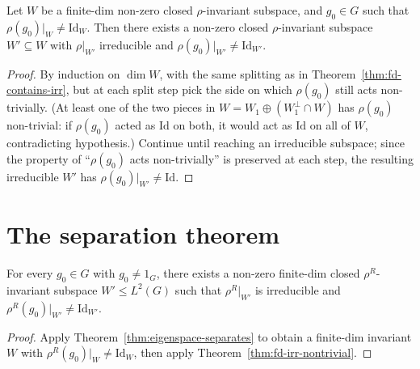 \begin{theorem}
  \label{thm:fd-irr-nontrivial}
  Let $W$ be a finite-dim non-zero closed $\rho$-invariant subspace, and
  $g_0 \in G$ such that $\rho(g_0)|_W \neq \mathrm{Id}_W$. Then there
  exists a non-zero closed $\rho$-invariant subspace $W' \subseteq W$
  with $\rho|_{W'}$ irreducible and $\rho(g_0)|_{W'} \neq \mathrm{Id}_{W'}$.
\end{theorem}

\begin{proof}
  By induction on $\dim W$, with the same splitting as in
  Theorem~\ref{thm:fd-contains-irr}, but at each split step pick the
  side on which $\rho(g_0)$ still acts non-trivially. (At least one of
  the two pieces in $W = W_1 \oplus (W_1^\perp \cap W)$ has $\rho(g_0)$
  non-trivial: if $\rho(g_0)$ acted as $\mathrm{Id}$ on both, it would
  act as $\mathrm{Id}$ on all of $W$, contradicting hypothesis.) Continue
  until reaching an irreducible subspace; since the property of
  ``$\rho(g_0)$ acts non-trivially'' is preserved at each step, the
  resulting irreducible $W'$ has $\rho(g_0)|_{W'} \neq \mathrm{Id}$.
\end{proof}

\section{The separation theorem}

\begin{theorem}
  \label{thm:separating-irr}
  \leanok
  For every $g_0 \in G$ with $g_0 \neq 1_G$, there exists a non-zero
  finite-dim closed $\rho^R$-invariant subspace $W' \leq L^2(G)$ such
  that $\rho^R|_{W'}$ is irreducible and $\rho^R(g_0)|_{W'} \neq \mathrm{Id}_{W'}$.
\end{theorem}

\begin{proof}
  Apply Theorem~\ref{thm:eigenspace-separates} to obtain a finite-dim
  invariant $W$ with $\rho^R(g_0)|_W \neq \mathrm{Id}_W$, then apply
  Theorem~\ref{thm:fd-irr-nontrivial}.
\end{proof}


